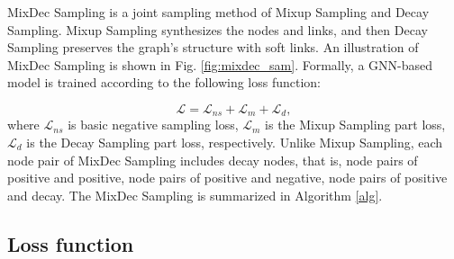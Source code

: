 MixDec Sampling is a joint sampling method of Mixup Sampling and Decay Sampling.
Mixup Sampling synthesizes the nodes and links, and then Decay Sampling preserves the graph's structure with soft links.
An illustration of MixDec Sampling is shown in Fig. \ref{fig:mixdec_sam}.
Formally, a GNN-based model is trained according to the following loss function:

\begin{equation}\label{loss}
\mathcal{L}=\mathcal{L}_{ns}+ \mathcal{L}_{m} + \mathcal{L}_{d},
\end{equation}
where $\mathcal{L}_{ns}$ is  basic negative sampling loss, $\mathcal{L}_{m}$ is the Mixup Sampling part loss, $\mathcal{L}_{d}$ is the Decay Sampling part loss, respectively.
Unlike Mixup Sampling,
each node pair of MixDec Sampling includes decay nodes, that is, node pairs of positive and positive, node pairs of positive and negative, node pairs of positive and decay. The MixDec Sampling is summarized in Algorithm \ref{alg}.


\subsection{\textbf{Loss function}}\label{other}


